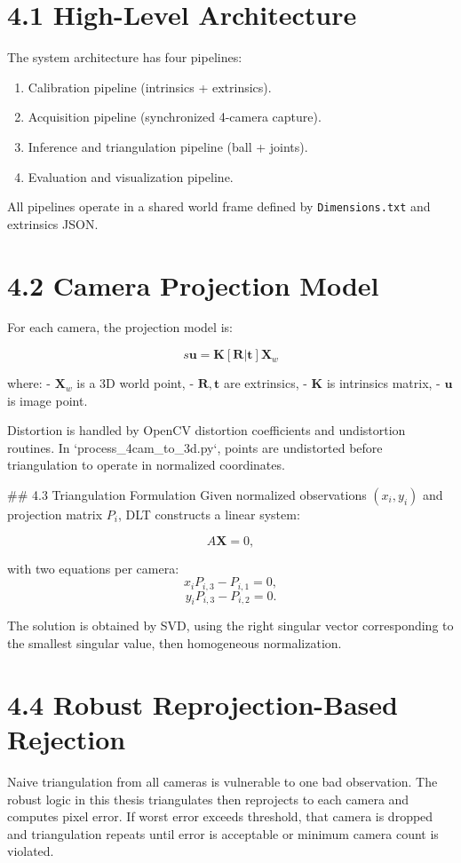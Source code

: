 \section{4.1 High-Level Architecture}
The system architecture has four pipelines:
\begin{enumerate}
  \item Calibration pipeline (intrinsics + extrinsics).
  \item Acquisition pipeline (synchronized 4-camera capture).
  \item Inference and triangulation pipeline (ball + joints).
  \item Evaluation and visualization pipeline.
\end{enumerate}

All pipelines operate in a shared world frame defined by \texttt{Dimensions.txt} and extrinsics JSON.

\section{4.2 Camera Projection Model}
For each camera, the projection model is:

\[ s\mathbf{u} = \mathbf{K}[\mathbf{R}|\mathbf{t}]\mathbf{X}_w \]

where:
- \(\mathbf{X}_w\) is a 3D world point,
- \(\mathbf{R}, \mathbf{t}\) are extrinsics,
- \(\mathbf{K}\) is intrinsics matrix,
- \(\mathbf{u}\) is image point.

Distortion is handled by OpenCV distortion coefficients and undistortion routines. In `process_4cam_to_3d.py`, points are undistorted before triangulation to operate in normalized coordinates.

## 4.3 Triangulation Formulation
Given normalized observations \((x_i, y_i)\) and projection matrix \(P_i\), DLT constructs a linear system:

\[
A\mathbf{X}=0,
\]

with two equations per camera:
\[
x_iP_{i,3} - P_{i,1}=0,
\]
\[
y_iP_{i,3} - P_{i,2}=0.
\]

The solution is obtained by SVD, using the right singular vector corresponding to the smallest singular value, then homogeneous normalization.

\section{4.4 Robust Reprojection-Based Rejection}
Naive triangulation from all cameras is vulnerable to one bad observation. The robust logic in this thesis triangulates then reprojects to each camera and computes pixel error. If worst error exceeds threshold, that camera is dropped and triangulation repeats until error is acceptable or minimum camera count is violated.

